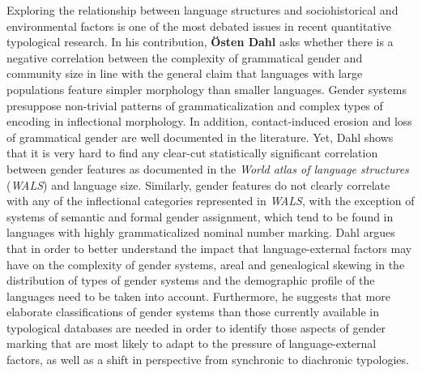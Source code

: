 \documentclass[output=collectionpaper]{langsci/langscibook}
\begin{document}
Exploring the relationship between language structures and sociohistorical and environmental factors is one of the most debated issues in recent quantitative typological research. In his contribution, \textbf{Östen Dahl} asks whether there is a negative correlation between the complexity of grammatical gender and community size in line with the general claim that languages with large populations feature simpler morphology than smaller languages. Gender systems presuppose non-trivial patterns of grammaticalization and complex types of encoding in inflectional morphology. In addition, contact-induced erosion and loss of grammatical gender are well documented in the literature. Yet, Dahl shows that it is very hard to find any clear-cut statistically significant correlation between gender features as documented in the \textit{World atlas of language structures} (\textit{WALS}) and language size. Similarly, gender features do not clearly correlate with any of the inflectional categories represented in \textit{WALS}, with the exception of systems of semantic and formal gender assignment, which tend to be found in languages with highly grammaticalized nominal number marking. Dahl argues that in order to better understand the impact that language-external factors may have on the complexity of gender systems, areal and genealogical skewing in the distribution of types of gender systems and the demographic profile of the languages need to be taken into account. Furthermore, he suggests that more elaborate classifications of gender systems than those currently available in typological databases are needed in order to identify those aspects of gender marking that are most likely to adapt to the pressure of language-external factors, as well as a shift in perspective from synchronic to diachronic typologies.
\end{document}
